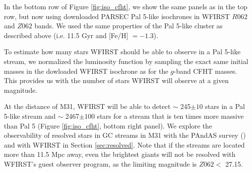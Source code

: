 \documentclass[twocolumn]{aastex62}
\begin{document}
In the bottom row of Figure \ref{fig:iso_cfht}, we show the same panels as in the top row, but now using downloaded PARSEC Pal 5-like isochrones in WFIRST $R062$ and $Z062$ bands. We used the same properties of the Pal 5-like cluster as described above (i.e. 11.5 Gyr and [Fe/H] $= -1.3$). 

To estimate how many stars WFIRST should be able to observe in a Pal 5-like stream, we normalized the luminosity function by sampling the exact same initial masses in the dowloaded WFIRST isochrone as for the $g$-band CFHT masses. This provides us with the number of stars WFIRST will observe at a given magnitude. 

At the distance of M31, WFIRST will be able to detect $\sim$ 245$\pm 10$ stars in a Pal 5-like stream and $\sim$  2467$\pm 100$ stars for a stream that is ten times more massive than Pal 5 (Figure \ref{fig:iso_cfht}, bottom right panel). We explore the observability of resolved stars in GC streams in M31 with the PAndAS survey (\citealt{mcconnachie09}) and with WFIRST in Section \ref{sec:resolved}. Note that if the streams are located more than 11.5 Mpc away, even the brightest giants will not be resolved with WFIRST's guest observer program, as the limiting magnitude is $Z062 <$  27.15. 
\end{document}
